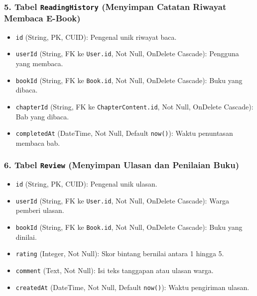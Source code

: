 \documentclass[
  indonesian,
  12pt,
]{report}
\providecommand{\tightlist}{%
  \setlength{\itemsep}{0pt}\setlength{\parskip}{0pt}}
\begin{document}
\subsubsection{\texorpdfstring{5. Tabel \texttt{ReadingHistory}
(Menyimpan Catatan Riwayat Membaca
E-Book)}{5. Tabel ReadingHistory (Menyimpan Catatan Riwayat Membaca E-Book)}}\label{tabel-readinghistory-menyimpan-catatan-riwayat-membaca-e-book}

\begin{itemize}
\tightlist
\item
  \texttt{id} (String, PK, CUID): Pengenal unik riwayat baca.
\item
  \texttt{userId} (String, FK ke \texttt{User.id}, Not Null, OnDelete
  Cascade): Pengguna yang membaca.
\item
  \texttt{bookId} (String, FK ke \texttt{Book.id}, Not Null, OnDelete
  Cascade): Buku yang dibaca.
\item
  \texttt{chapterId} (String, FK ke \texttt{ChapterContent.id}, Not
  Null, OnDelete Cascade): Bab yang dibaca.
\item
  \texttt{completedAt} (DateTime, Not Null, Default \texttt{now()}):
  Waktu penuntasan membaca bab.
\end{itemize}

\subsubsection{\texorpdfstring{6. Tabel \texttt{Review} (Menyimpan
Ulasan dan Penilaian
Buku)}{6. Tabel Review (Menyimpan Ulasan dan Penilaian Buku)}}\label{tabel-review-menyimpan-ulasan-dan-penilaian-buku}

\begin{itemize}
\tightlist
\item
  \texttt{id} (String, PK, CUID): Pengenal unik ulasan.
\item
  \texttt{userId} (String, FK ke \texttt{User.id}, Not Null, OnDelete
  Cascade): Warga pemberi ulasan.
\item
  \texttt{bookId} (String, FK ke \texttt{Book.id}, Not Null, OnDelete
  Cascade): Buku yang dinilai.
\item
  \texttt{rating} (Integer, Not Null): Skor bintang bernilai antara 1
  hingga 5.
\item
  \texttt{comment} (Text, Not Null): Isi teks tanggapan atau ulasan
  warga.
\item
  \texttt{createdAt} (DateTime, Not Null, Default \texttt{now()}): Waktu
  pengiriman ulasan.
\end{itemize}
\end{document}
